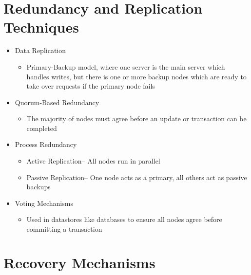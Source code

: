 \section*{Redundancy and Replication Techniques}

\begin{itemize}
  \item Data Replication
  \begin{itemize}
    \item Primary-Backup model, where one server is the main server which handles writes, but there is one or more backup nodes which are ready to take over requests if the primary node fails
  \end{itemize}
  \item Quorum-Based Redundancy
  \begin{itemize}
    \item The majority of nodes must agree before an update or transaction can be completed
  \end{itemize}
  \item Process Redundancy
  \begin{itemize}
    \item Active Replication-- All nodes run in parallel
    \item Passive Replication-- One node acts as a primary, all others act as passive backups
  \end{itemize}
  \item Voting Mechanisms
  \begin{itemize}
    \item Used in datastores like databases to ensure all nodes agree before committing a transaction
  \end{itemize}
\end{itemize}

\section*{Recovery Mechanisms}

